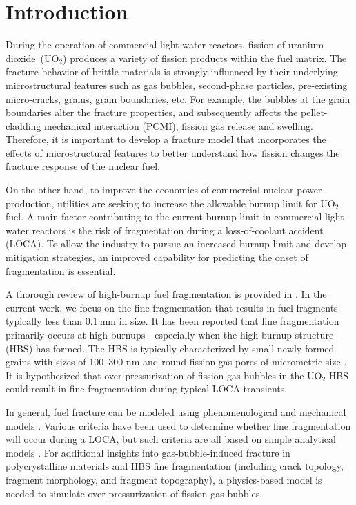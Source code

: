 \section{Introduction}
\label{section: brittle/intro}

During the operation of commercial light water reactors, fission of uranium dioxide~(UO$_2$) produces a variety of fission products within the fuel matrix. The fracture behavior of brittle materials is strongly influenced by their underlying microstructural features such as gas bubbles, second-phase particles, pre-existing micro-cracks, grains, grain boundaries, etc. For example, the bubbles at the grain boundaries alter the fracture properties, and subsequently affects the pellet-cladding mechanical interaction (PCMI), fission gas release and swelling. Therefore, it is important to develop a fracture model that incorporates the effects of microstructural features to better understand how fission changes the fracture response of the nuclear fuel.

On the other hand, to improve the economics of commercial nuclear power production, utilities are seeking to increase the allowable burnup limit for UO$_2$ fuel. A main factor contributing to the current burnup limit in commercial light-water reactors is the risk of fragmentation during a loss-of-coolant accident (LOCA). To allow the industry to pursue an increased burnup limit and develop mitigation strategies, an improved capability for predicting the onset of fragmentation is essential.

A thorough review of high-burnup fuel fragmentation is provided in \cite{CAPPS2021152750}. In the current work, we focus on the fine fragmentation that results in fuel fragments typically less than $\SI{0.1}{\milli\meter}$ in size. It has been reported that fine fragmentation primarily occurs at high burnups---especially when the high-burnup structure (HBS) has formed. The HBS is typically characterized by small newly formed grains with sizes of 100--300 nm and round fission gas pores of micrometric size \cite{RONDINELLA201024}. It is hypothesized that over-pressurization of fission gas bubbles in the UO$_2$ HBS could result in fine fragmentation during typical LOCA transients.

In general, fuel fracture can be modeled using phenomenological \cite{Turnbull2015} and mechanical models \cite{JIANG2020106713}. Various criteria have been used to determine whether fine fragmentation will occur during a LOCA, but such criteria are all based on simple analytical models \cite{KULACSY2015409, JERNKVIST2020103188}. For additional insights into gas-bubble-induced fracture in polycrystalline materials and HBS fine fragmentation (including crack topology, fragment morphology, and fragment topography), a physics-based model is needed to simulate over-pressurization of fission gas bubbles.

